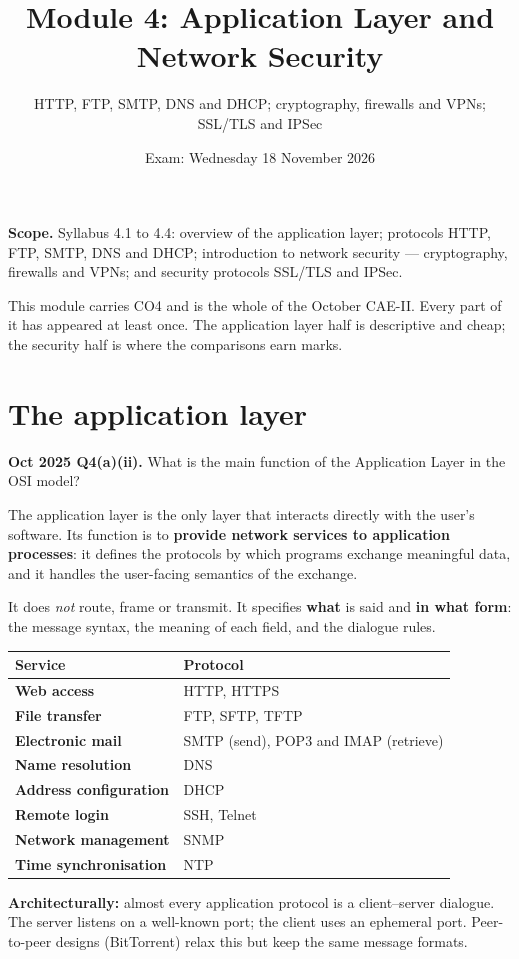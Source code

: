 \documentclass[11pt,a4paper]{article}
\title{\textbf{Module 4: Application Layer and Network Security}\\}
\author{\large HTTP, FTP, SMTP, DNS and DHCP; cryptography, firewalls and VPNs;\\
SSL/TLS and IPSec}
\date{Exam: Wednesday 18 November 2026}
\begin{document}
\maketitle

\begin{exambox}
\textbf{Scope.} Syllabus 4.1 to 4.4: overview of the application layer; protocols HTTP, FTP, SMTP, DNS and DHCP; introduction to network security --- cryptography, firewalls and VPNs; and security protocols SSL/TLS and IPSec.

This module carries CO4 and is the whole of the October CAE-II. Every part of it has appeared at least once. The application layer half is descriptive and cheap; the security half is where the comparisons earn marks.
\end{exambox}

\tableofcontents
\newpage

\section{The application layer}

\begin{pyqbox}
\textbf{Oct 2025 Q4(a)(ii).} What is the main function of the Application Layer in the OSI model?
\end{pyqbox}

\begin{solbox}
The application layer is the only layer that interacts directly with the user's software. Its function is to \textbf{provide network services to application processes}: it defines the protocols by which programs exchange meaningful data, and it handles the user-facing semantics of the exchange.

It does \emph{not} route, frame or transmit. It specifies \textbf{what} is said and \textbf{in what form}: the message syntax, the meaning of each field, and the dialogue rules.

\begin{center}\small
\begin{tabularx}{\textwidth}{>{\bfseries}p{} X}
\toprule Service & Protocol\\
\midrule
Web access & HTTP, HTTPS\\
File transfer & FTP, SFTP, TFTP\\
Electronic mail & SMTP (send), POP3 and IMAP (retrieve)\\
Name resolution & DNS\\
Address configuration & DHCP\\
Remote login & SSH, Telnet\\
Network management & SNMP\\
Time synchronisation & NTP\\
\bottomrule
\end{tabularx}
\end{center}

\textbf{Architecturally:} almost every application protocol is a client--server dialogue. The server listens on a well-known port; the client uses an ephemeral port. Peer-to-peer designs (BitTorrent) relax this but keep the same message formats.
\end{solbox}
\end{document}
